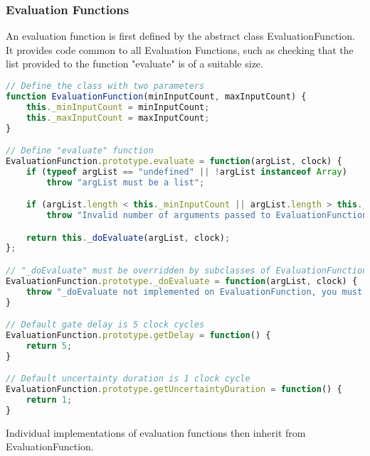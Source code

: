 \subsubsection{Evaluation Functions}
An evaluation function is first defined by the abstract class EvaluationFunction. It provides code common to all Evaluation Functions, such as checking that the list provided to the function "evaluate" is of a suitable size.

\begin{lstlisting}[language=JavaScript]
// Define the class with two parameters
function EvaluationFunction(minInputCount, maxInputCount) {
    this._minInputCount = minInputCount;
    this._maxInputCount = maxInputCount;
}

// Define "evaluate" function
EvaluationFunction.prototype.evaluate = function(argList, clock) {
    if (typeof argList == "undefined" || !argList instanceof Array)
        throw "argList must be a list";

    if (argList.length < this._minInputCount || argList.length > this._maxInputCount)
        throw "Invalid number of arguments passed to EvaluationFunction";

    return this._doEvaluate(argList, clock);
};

// "_doEvaluate" must be overridden by subclasses of EvaluationFunction
EvaluationFunction.prototype._doEvaluate = function(argList, clock) {
    throw "_doEvaluate not implemented on EvaluationFunction, you must override it";
}

// Default gate delay is 5 clock cycles
EvaluationFunction.prototype.getDelay = function() {
    return 5;
}

// Default uncertainty duration is 1 clock cycle
EvaluationFunction.prototype.getUncertaintyDuration = function() {
    return 1;
}
\end{lstlisting}

Individual implementations of evaluation functions then inherit from EvaluationFunction.

